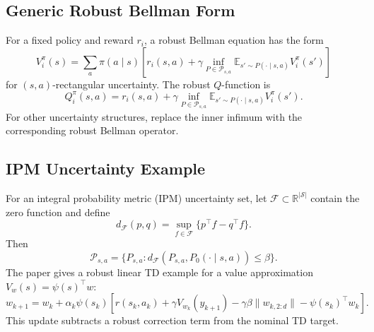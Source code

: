 \documentclass[11pt]{article}
\newcommand{\Sset}{\mathcal S}
\newcommand{\Pset}{\mathcal P}
\newcommand{\Fset}{\mathcal F}
\newcommand{\E}{\mathbb E}
\newcommand{\R}{\mathbb R}
\newcommand{\1}{\mathbf 1}
\begin{document}
\subsection{Generic Robust Bellman Form}
For a fixed policy and reward $r_i$, a robust Bellman equation has the form
\begin{equation}
    V_i^\pi(s)
    =\sum_{a}\pi(a\mid s)\left[r_i(s,a)+\gamma\inf_{P\in\Pset_{s,a}}\E_{s'\sim P(\cdot\mid s,a)}V_i^\pi(s')\right]
\end{equation}
for $(s,a)$-rectangular uncertainty.  The robust $Q$-function is
\begin{equation}
    Q_i^\pi(s,a)=r_i(s,a)+\gamma\inf_{P\in\Pset_{s,a}}\E_{s'\sim P(\cdot\mid s,a)}V_i^\pi(s').
    \label{eq:robust-q-bellman}
\end{equation}
For other uncertainty structures, replace the inner infimum with the corresponding robust Bellman operator.

\subsection{IPM Uncertainty Example}
For an integral probability metric (IPM) uncertainty set, let $\Fset\subset\R^{|\Sset|}$ contain the zero function and define
\begin{equation}
    d_{\Fset}(p,q)=\sup_{f\in\Fset}\{p^\top f-q^\top f\}.
\end{equation}
Then
\begin{equation}
    \Pset_{s,a}=\{P_{s,a}:d_{\Fset}(P_{s,a},P_0(\cdot\mid s,a))\le\beta\}.
\end{equation}
The paper gives a robust linear TD example for a value approximation $V_w(s)=\psi(s)^\top w$:
\begin{equation}
    w_{k+1}=w_k+\alpha_k\psi(s_k)\left[r(s_k,a_k)+\gamma V_{w_k}(y_{k+1})-\gamma\beta\|w_{k,2:d}\|-\psi(s_k)^\top w_k\right].
    \label{eq:ipm-td}
\end{equation}
This update subtracts a robust correction term from the nominal TD target.
\end{document}
